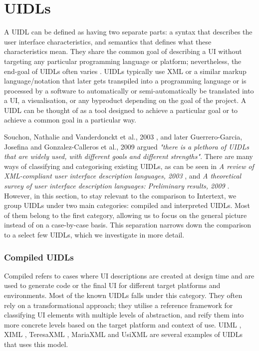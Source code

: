 
\section{UIDLs} \label{relatedUIDLs}

A UIDL can be defined as having two separate parts: a syntax that describes the user interface characteristics, and semantics that defines what these characteristics mean. They share the common goal of describing a UI without targeting any particular programming language or platform; nevertheless, the end-goal of UIDLs often varies \cite{XMLCompliantUIDLs}. UIDLs typically use XML or a similar markup language/notation that later gets transpiled into a programming language or is processed by a software to automatically or semi-automatically be translated into a UI, a visualisation, or any byproduct depending on the goal of the project. A UIDL can be thought of as a tool designed to achieve a particular goal or to achieve a common goal in a particular way. 

Souchon, Nathalie and Vanderdonckt et al., 2003 \cite{XMLCompliantUIDLs}, and later Guerrero-Garcia, Josefina and Gonzalez-Calleros et al., 2009 \cite{UIDLTheoreticalSurvey} argued \textit{"there is a plethora of UIDLs that are widely used, with different goals and different strengths"}. There are many ways of classifying and categorising existing UIDLs, as can be seen in \textit{A review of XML-compliant user interface description languages, 2003} \cite{XMLCompliantUIDLs}, and \textit{A theoretical survey of user interface description languages: Preliminary results, 2009} \cite{UIDLTheoreticalSurvey}. However, in this section, to stay relevant to the comparison to Intertext, we group UIDLs under two main categories: compiled and interpreted UIDLs. Most of them belong to the first category, allowing us to focus on the general picture instead of on a case-by-case basis. This separation narrows down the comparison to a select few UIDLs, which we investigate in more detail.

\subsubsection{Compiled UIDLs}

Compiled refers to cases where UI descriptions are created at design time and are used to generate code or the final UI for different target platforms and environments. Most of the known UIDLs falls under this category. They often rely on a transformational approach; they utilise a reference framework for classifying UI elements with multiple levels of abstraction, and reify them into more concrete levels based on the target platform and context of use. UIML \cite{UIML}, XIML \cite{XIML}, TeresaXML \cite{TeresaXML}, MariaXML \cite{MariaXML} and UsiXML \cite{UsiXML} are several examples of UIDLs that uses this model. 

